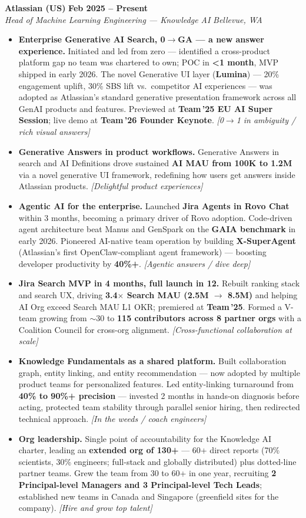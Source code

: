 \documentclass[10.5pt,letterpaper]{article}
\newcommand{\role}[4]{%
  \noindent\textbf{#1} \hfill \textbf{#3}\\
  \textit{#2} \hfill \textit{#4}\par\vspace{2pt}}
\newcommand{\lp}[1]{\textcolor{blue!55!black}{\small\textit{[#1]}}}
\begin{document}
\role{Atlassian (US)}{Head of Machine Learning Engineering --- Knowledge AI}{Feb 2025 -- Present}{Bellevue, WA}
\begin{itemize}
  \item \textbf{Enterprise Generative AI Search, 0$\to$GA --- a new answer experience.} Initiated and led from zero --- identified a cross-product platform gap no team was chartered to own; POC in \textbf{<1 month}, MVP shipped in early 2026. The novel Generative UI layer (\textbf{Lumina}) --- 20\% engagement uplift, 30\% SBS lift vs.\ competitor AI experiences --- was adopted as Atlassian's standard generative presentation framework across all GenAI products and features. Previewed at \textbf{Team\,'25 EU AI Super Session}; live demo at \textbf{Team\,'26 Founder Keynote}. \lp{0$\to$1 in ambiguity / rich visual answers}
  \item \textbf{Generative Answers in product workflows.} Generative Answers in search and AI Definitions drove sustained \textbf{AI MAU from 100K to 1.2M} via a novel generative UI framework, redefining how users get answers inside Atlassian products. \lp{Delightful product experiences}
  \item \textbf{Agentic AI for the enterprise.} Launched \textbf{Jira Agents in Rovo Chat} within 3 months, becoming a primary driver of Rovo adoption. Code-driven agent architecture beat Manus and GenSpark on the \textbf{GAIA benchmark} in early 2026. Pioneered AI-native team operation by building \textbf{X-SuperAgent} (Atlassian's first OpenClaw-compliant agent framework) --- boosting developer productivity by \textbf{40\%+}. \lp{Agentic answers / dive deep}
  \item \textbf{Jira Search MVP in 4 months, full launch in 12.} Rebuilt ranking stack and search UX, driving \textbf{3.4$\times$ Search MAU (2.5M $\to$ 8.5M)} and helping AI Org exceed Search MAU L1 OKR; premiered at \textbf{Team\,'25}. Formed a V-team growing from $\sim$30 to \textbf{115 contributors across 8 partner orgs} with a Coalition Council for cross-org alignment. \lp{Cross-functional collaboration at scale}
  \item \textbf{Knowledge Fundamentals as a shared platform.} Built collaboration graph, entity linking, and entity recommendation --- now adopted by multiple product teams for personalized features. Led entity-linking turnaround from \textbf{40\% to 90\%+ precision} --- invested 2 months in hands-on diagnosis before acting, protected team stability through parallel senior hiring, then redirected technical approach. \lp{In the weeds / coach engineers}
  \item \textbf{Org leadership.} Single point of accountability for the Knowledge AI charter, leading an \textbf{extended org of 130+} --- 60+ direct reports (70\% scientists, 30\% engineers; full-stack and globally distributed) plus dotted-line partner teams. Grew the team from 30 to 60+ in one year, recruiting \textbf{2 Principal-level Managers and 3 Principal-level Tech Leads}; established new teams in Canada and Singapore (greenfield sites for the company). \lp{Hire and grow top talent}
\end{itemize}
\end{document}
